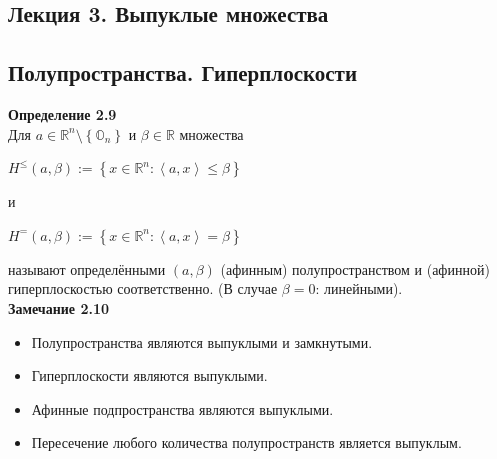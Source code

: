 \vspace{3cm}
\begin{center}
\section{Лекция 3. Выпуклые множества}
\end{center}
\subsection{Полупространства. Гиперплоскости}

\textbf{Определение 2.9}\\
Для $a\in\mathbb{R}^n\setminus \left \{ \mathbb{O}_n \right \}$ и $\beta\in\mathbb{R}$ множества
\begin{center}
\textbf{$H^\leq(a,\beta):= \left \{ x\in\mathbb{R}^n: \left \langle a,x \right \rangle \leq \beta \right \}$} \\
\end{center}
и
\begin{center}
\textbf{$H^=(a,\beta):= \left \{ x\in\mathbb{R}^n: \left \langle a,x \right \rangle = \beta \right \}$} \\
\end{center}
называют определёнными $(a,\beta)$ (афинным) полупространством и (афинной) гиперплоскостью соответственно. (В случае $\beta=0$: линейными).\\

\noindent\textbf{Замечание 2.10}
\begin{itemize}
    \item Полупространства являются выпуклыми и замкнутыми.
\end{itemize}
\begin{itemize}
    \item Гиперплоскости являются выпуклыми.
\end{itemize}
\begin{itemize}
    \item Афинные подпространства являются выпуклыми.
\end{itemize}
\begin{itemize}
    \item Пересечение любого количества полупространств является выпуклым.
\end{itemize}
